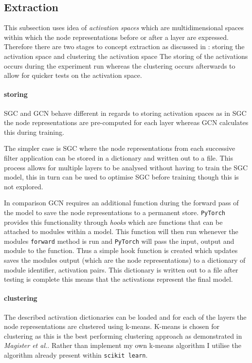 \subsection{Extraction}
\label{sec:extraction}

This subsection uses idea of \emph{activation spaces} which are multidimensional spaces within which the node representations before or after a layer are expressed.
Therefore there are two stages to concept extraction as discussed in : storing the activation space and clustering the activation space
The storing of the activations occurs during the experiment run whereas the clustering occurs afterwards to allow for quicker tests on the activation space.

\paragraph{storing}
SGC and GCN behave different in regards to storing activation spaces as in SGC the node representations are pre-computed for each layer whereas GCN calculates this during training.

The simpler case is SGC where the node representations from each successive filter application can be stored in a dictionary and written out to a file.
This process allows for multiple layers to be analysed without having to train the SGC model, this in turn can be used to optimise SGC before training though this is not explored.

In comparison GCN requires an additional function during the forward pass of the model to save the node representations to a permanent store.
\texttt{PyTorch}\cite{paszke2019pytorch} provides this functionality through \emph{hooks} which are functions that can be attached to modules within a model.
This function will then run whenever the modules \texttt{forward} method is run and \texttt{PyTorch} will pass the input, output and module to the function.
Thus a simple hook function is created which updates saves the modules output (which are the node representations) to a dictionary of module identifier, activation pairs.
This dictionary is written out to a file after testing is complete this means that the activations represent the final model.

\paragraph{clustering}
The described activation dictionaries can be loaded and for each of the layers the node representations are clustered using k-means.
K-means is chosen for clustering as this is the best performing clustering approach as demonstrated in \textit{Magister et al.}\cite{magister2021gcexplainer}.
Rather than implement my own k-means algorithm I utilise the algorithm already present within \texttt{scikit learn}\cite{scikit-learn}.

